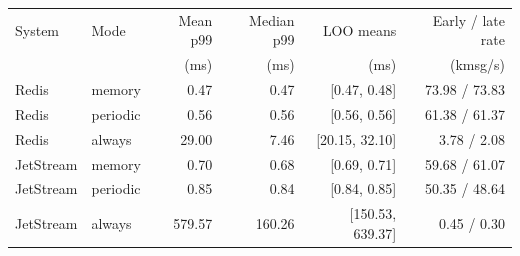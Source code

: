 \begin{tabular}{llrrrr}
\toprule
System & Mode & Mean p99 & Median p99 & LOO means & Early / late rate\\
 & & (ms) & (ms) & (ms) & (kmsg/s)\\
\midrule
Redis & memory & 0.47 & 0.47 & [0.47, 0.48] & 73.98 / 73.83\\
Redis & periodic & 0.56 & 0.56 & [0.56, 0.56] & 61.38 / 61.37\\
Redis & always & 29.00 & 7.46 & [20.15, 32.10] & 3.78 / 2.08\\
JetStream & memory & 0.70 & 0.68 & [0.69, 0.71] & 59.68 / 61.07\\
JetStream & periodic & 0.85 & 0.84 & [0.84, 0.85] & 50.35 / 48.64\\
JetStream & always & 579.57 & 160.26 & [150.53, 639.37] & 0.45 / 0.30\\
\bottomrule
\end{tabular}
